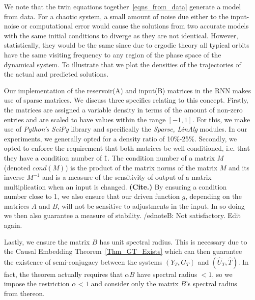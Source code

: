 \documentclass[a4paper,12pt,twoside]{report}
\begin{document}
We note that the twin equations together~\ref{eqns_from_data} generate a model from data. For a chaotic system, a small amount of noise due either to the input-noise or computational error would cause the solutions from two accurate models with the same initial conditions to  diverge as they are not identical.  However, statistically, they would be the same since due to ergodic theory all typical orbits have the same visiting frequency to any region of the phase space of the dynamical system.  To illustrate that we plot the densities of the trajectories of the actual and predicted solutions. 

Our implementation of the reservoir(A) and input(B) matrices in the RNN makes use of sparse matrices. We discuss three specifics relating to this concept. Firstly, the matrices are assigned a variable density in terms of the amount of non-zero entries and are scaled to have values within the range $[-1,1]$. For this, we make use of \textit{Python's SciPy} library and specifically the \textit{Sparse, LinAlg} modules. In our experiments, we generally opted for a density ratio of 10\%-25\%.
Secondly, we opted to enforce the requirement that both matrices be well-conditioned, i.e. that they have a condition number of \~1. The condition number of a matrix $M$ (denoted $cond(M)$) is the product of the matrix norms of the matrix $M$ and its inverse $M^{-1}$ and is a measure of the sensitivity of output of a matrix multiplication when an input is changed. \textbf{(Cite.)} By ensuring a condition number close to 1, we also ensure that our driven function $g$, depending on the matrices $A$ and $B$, will not be sensitive to adjustments in the input. In so doing we then also guarantee a measure of stability. /ednote{B: Not satisfactory. Edit again.}

Lastly, we ensure the matrix $B$ has unit spectral radius. This is necessary due to the Causal Embedding Theorem~\ref{Thm_GT_Exists} which can then guarantee the existence of semi-conjugacy between the systems $(Y_T, G_T)$ and $(\widehat{U}_T, \widehat{T})$. In fact, the theorem actually requires that $\alpha{B}$ have spectral radius $<1$, so we impose the restriction $\alpha<1$ and consider only the matrix $B$'s spectral radius from thereon.
\end{document}
